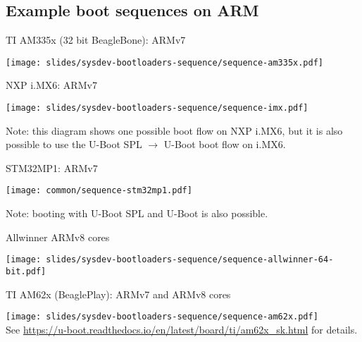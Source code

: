 \subsection{Example boot sequences on ARM}

\begin{frame}{TI AM335x (32 bit BeagleBone): ARMv7}
  \begin{center}
    \texttt{[image: slides/sysdev-bootloaders-sequence/sequence-am335x.pdf]}
  \end{center}
\end{frame}

\begin{frame}{NXP i.MX6: ARMv7}
  \begin{center}
    \texttt{[image: slides/sysdev-bootloaders-sequence/sequence-imx.pdf]}
  \end{center}
  \vspace{0.1cm}
  Note: this diagram shows one possible boot flow on NXP i.MX6, but it
  is also possible to use the U-Boot SPL $\rightarrow$ U-Boot boot
  flow on i.MX6.
\end{frame}

\begin{frame}{STM32MP1: ARMv7}
  \begin{center}
    \texttt{[image: common/sequence-stm32mp1.pdf]}
  \end{center}
  \vspace{0.3cm}
  Note: booting with U-Boot SPL and U-Boot is also possible.
\end{frame}

\begin{frame}{Allwinner ARMv8 cores}
  \begin{center}
    \texttt{[image: slides/sysdev-bootloaders-sequence/sequence-allwinner-64-bit.pdf]}
  \end{center}
\end{frame}

\begin{frame}{TI AM62x (BeaglePlay): ARMv7 and ARMv8 cores}
  \begin{center}
    \texttt{[image: slides/sysdev-bootloaders-sequence/sequence-am62x.pdf]}\\
    \footnotesize See \url{https://u-boot.readthedocs.io/en/latest/board/ti/am62x_sk.html} for details.
  \end{center}
\end{frame}
